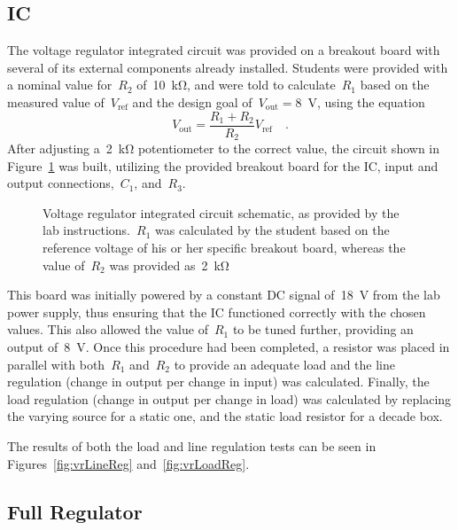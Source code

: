 \subsection{IC}
The voltage regulator integrated circuit was provided on a breakout board with
several of its external components already installed.  Students were provided
with a nominal value for~$R_2$ of~\SI{10}{\kilo\ohm}, and were told to
calculate~$R_1$ based on the measured value of~$V_\text{ref}$ and the design
goal of~$V_\text{out} = $\SI{8}{\volt}, using the equation
%
\begin{equation}
	V_\text{out} = \frac{R_1 + R_2}{R_2} V_\text{ref} \quad \text{.}
	\label{eq:calcR1}
\end{equation}
%
After adjusting a~\SI{2}{\kilo\ohm} potentiometer to the correct value, the
circuit shown in Figure~\ref{fig:icSchem} was built, utilizing the provided
breakout board for the IC, input and output connections,~$C_1$, and~$R_3$.
%
\begin{figure}[H]
	\centering
	
	\parbox{.6\textwidth}{
	\caption{Voltage regulator integrated circuit schematic, as provided by the
	lab instructions.~$R_1$ was calculated by the student based on the
	reference voltage of his or her specific breakout board, whereas the value
	of~$R_2$ was provided as~\SI{2}{\kilo\ohm}}
	\label{fig:icSchem}
	}
\end{figure}
%
This board was initially powered by a constant DC signal of~\SI{18}{\volt} from
the lab power supply, thus ensuring that the IC functioned correctly with the
chosen values.  This also allowed the value of~$R_1$ to be tuned further,
providing an output of~\SI{8}{\volt}.  Once this procedure had been completed,
a resistor was placed in parallel with both~$R_1$ and~$R_2$ to provide an
adequate load and the line regulation (change in output per change in input)
was calculated.  Finally, the load regulation (change in output per change in
load) was calculated by replacing the varying source for a static one, and the
static load resistor for a decade box.

The results of both the load and line regulation tests can be seen in
Figures~\ref{fig:vrLineReg} and~\ref{fig:vrLoadReg}.

\subsection{Full Regulator}
\begin{figure}[H]
	\centering
	
\end{figure}
